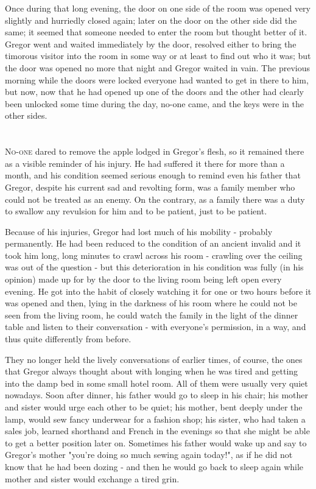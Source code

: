 \documentclass[11pt,openany]{memoir}
\begin{document}
Once during that long evening, the door on one side of the room was
opened very slightly and hurriedly closed again; later on the door
on the other side did the same; it seemed that someone needed to
enter the room but thought better of it.  Gregor went and waited
immediately by the door, resolved either to bring the timorous
visitor into the room in some way or at least to find out who it
was; but the door was opened no more that night and Gregor waited in
vain.  The previous morning while the doors were locked everyone had
wanted to get in there to him, but now, now that he had opened up
one of the doors and the other had clearly been unlocked some time
during the day, no-one came, and the keys were in the other sides.

\chapter{}

\lettrine[lines=3]{N}{o-one} dared to remove the apple lodged in Gregor's flesh, so it
remained there as a visible reminder of his injury.  He had suffered
it there for more than a month, and his condition seemed serious
enough to remind even his father that Gregor, despite his current
sad and revolting form, was a family member who could not be treated
as an enemy.  On the contrary, as a family there was a duty to
swallow any revulsion for him and to be patient, just to be patient.

Because of his injuries, Gregor had lost much of his mobility -
probably permanently.  He had been reduced to the condition of an
ancient invalid and it took him long, long minutes to crawl across
his room - crawling over the ceiling was out of the question - but
this deterioration in his condition was fully (in his opinion) made
up for by the door to the living room being left open every evening.
 He got into the habit of closely watching it for one or two hours
before it was opened and then, lying in the darkness of his room
where he could not be seen from the living room, he could watch the
family in the light of the dinner table and listen to their
conversation - with everyone's permission, in a way, and thus quite
differently from before.

They no longer held the lively conversations of earlier times, of
course, the ones that Gregor always thought about with longing when
he was tired and getting into the damp bed in some small hotel room.
 All of them were usually very quiet nowadays.  Soon after dinner,
his father would go to sleep in his chair; his mother and sister
would urge each other to be quiet; his mother, bent deeply under the
lamp, would sew fancy underwear for a fashion shop; his sister, who
had taken a sales job, learned shorthand and French in the evenings
so that she might be able to get a better position later on.
Sometimes his father would wake up and say to Gregor's mother
"you're doing so much sewing again today!", as if he did not know
that he had been dozing - and then he would go back to sleep again
while mother and sister would exchange a tired grin.
\end{document}
